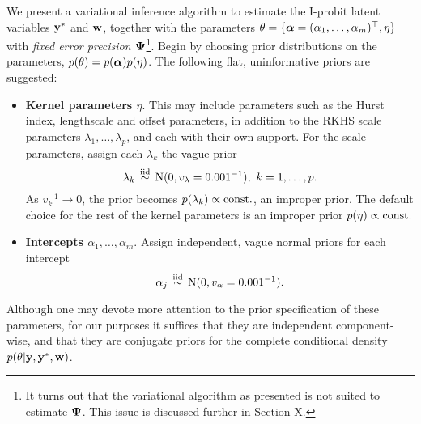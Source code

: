 We present a variational inference algorithm to estimate the I-probit latent variables ${\mathbf y}^*$ and ${\mathbf w}$, together with the parameters $\theta = \{{\bm\alpha} = (\alpha_1,\dots,\alpha_m)^\top,\eta \}$ with \emph{fixed error precision ${\bm\Psi}$}\footnote{It turns out that the variational algorithm as presented is not suited to estimate ${\bm\Psi}$. This issue is discussed further in Section X.}.
Begin by choosing prior distributions on the parameters, $p(\theta) = p({\bm\alpha})p(\eta)$. 
The following flat, uninformative priors are suggested:
\begin{itemize}
  \item \textbf{Kernel parameters $\eta$}. This may include parameters such as the Hurst index, lengthscale and offset parameters, in addition to the RKHS scale parameters $\lambda_1,\dots,\lambda_p$, and each with their own support.
  For the scale parameters, assign each $\lambda_k$ the vague prior
  \[
    \lambda_k \,\overset{\text{iid}}{\sim}\, \operatorname{N}(0,v_\lambda = 0.001^{-1}), \ k=1,\dots,p.
  \]
  As $v_k^{-1}\to 0$, the prior becomes $p(\lambda_k)\propto \text{const.}\hspace{0.01em}$, an improper prior.
  The default choice for the rest of the kernel parameters is an improper prior $p(\eta) \propto \text{const.}\hspace{0.01em}$
  \item \textbf{Intercepts $\alpha_1,\dots,\alpha_m$}. Assign independent, vague normal priors for each intercept
  \[
    \alpha_j \,\overset{\text{iid}}{\sim}\, \operatorname{N}(0,v_\alpha=0.001^{-1}).
  \]
\end{itemize}
Although one may devote more attention to the prior specification of these parameters, for our purposes it suffices that they are independent component-wise, and that they are conjugate priors for the complete conditional density $p(\theta|{\mathbf y},{\mathbf y}^*,{\mathbf w})$.

